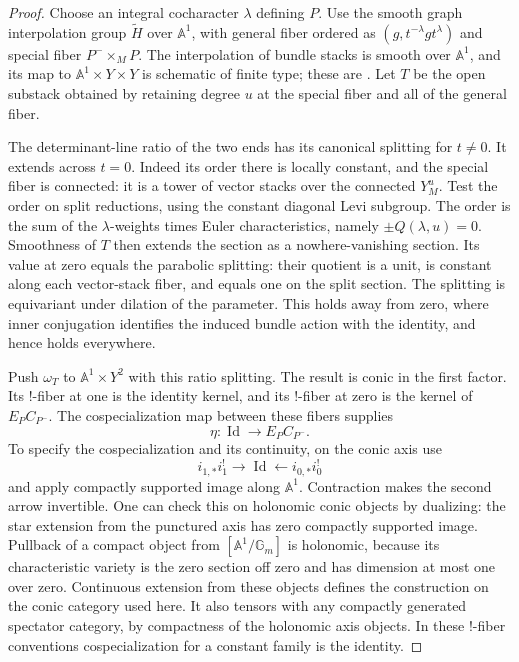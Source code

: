 \documentclass[11pt]{article}
\numberwithin{equation}{section}
\theoremstyle{definition}
\theoremstyle{remark}
\begin{document}
\begin{proof}
Choose an integral cocharacter $\lambda$ defining $P$.  Use the smooth graph
interpolation group $\widetilde H$ over $\mathbb A^1$, with general fiber
ordered as $(g,t^{-\lambda}gt^\lambda)$ and special fiber
$P^-\times_M P$.  The interpolation of bundle stacks is smooth over
$\mathbb A^1$, and its map to $\mathbb A^1\times Y\times Y$ is schematic of
finite type; these are
\cite[Section~2.4 and Proposition~2.5.2]{DrinfeldGaitsgoryCT}.  Let $T$ be the
open substack obtained by retaining degree $u$ at the special fiber and all
of the general fiber.

The determinant-line ratio of the two ends has its canonical splitting for
$t\ne0$.  It extends across $t=0$.  Indeed its order there is locally
constant, and the special fiber is connected: it is a tower of vector
stacks over the connected $Y_M^u$.  Test the order on split reductions,
using the constant diagonal Levi subgroup.  The order is the sum of the
$\lambda$-weights times Euler characteristics, namely $\pm Q(\lambda,u)=0$.
Smoothness of $T$ then extends the section as a nowhere-vanishing section.
Its value at zero equals the parabolic splitting: their quotient is a
unit, is constant along each vector-stack fiber, and equals one on the
split section.  The splitting is equivariant under dilation of the
parameter.  This holds away from zero, where inner conjugation identifies
the induced bundle action with the identity, and hence holds everywhere.

Push $\omega_T$ to $\mathbb A^1\times Y^2$ with this ratio splitting.  The
result is conic in the first factor.  Its !-fiber at one is the identity
kernel, and its !-fiber at zero is the kernel of $E_PC_{P^-}$.  The
cospecialization map between these fibers supplies
\[
 \eta:\operatorname{Id}\longrightarrow E_PC_{P^-}.
\]
To specify the cospecialization and its continuity, on the conic axis use
\[
 i_{1,*}i_1^!\longrightarrow\operatorname{Id}
 \longleftarrow i_{0,*}i_0^!
\]
and apply compactly supported image along $\mathbb A^1$.  Contraction makes
the second arrow invertible.  One can check this on holonomic conic
objects by dualizing: the star extension from the punctured axis has zero
compactly supported image.  Pullback of a compact object from
$[\mathbb A^1/\mathbb G_m]$ is holonomic, because its characteristic variety
is the zero section off zero and has dimension at most one over zero.
Continuous extension from these objects defines the construction on the
conic category used here.  It also tensors with any compactly generated
spectator category, by compactness of the holonomic axis objects.  In these
!-fiber conventions cospecialization for a constant family is the identity.


\end{proof}
\end{document}
